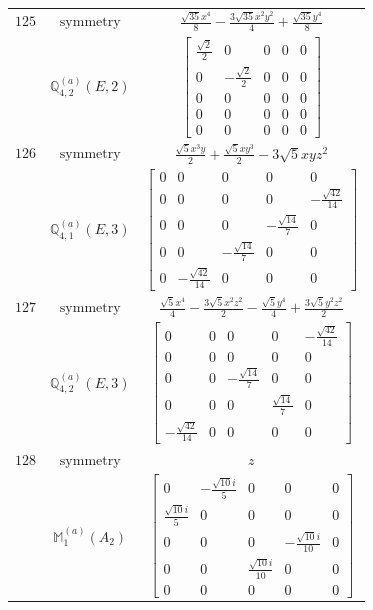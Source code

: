 \documentclass[fleqn,8pt,landscape]{jsarticle}
\begin{document}
\begin{longtable}{ccc}
$ 125 $ & $ \text{symmetry} $ & $ \frac{\sqrt{35} x^{4}}{8} - \frac{3 \sqrt{35} x^{2} y^{2}}{4} + \frac{\sqrt{35} y^{4}}{8} $ \\
$  $ & $ \mathbb{Q}_{4,2}^{(a)}(E,2) $ & $ \begin{bmatrix} \frac{\sqrt{2}}{2} & 0 & 0 & 0 & 0 \\ 0 & - \frac{\sqrt{2}}{2} & 0 & 0 & 0 \\ 0 & 0 & 0 & 0 & 0 \\ 0 & 0 & 0 & 0 & 0 \\ 0 & 0 & 0 & 0 & 0 \end{bmatrix} $ \\ \hline
$ 126 $ & $ \text{symmetry} $ & $ \frac{\sqrt{5} x^{3} y}{2} + \frac{\sqrt{5} x y^{3}}{2} - 3 \sqrt{5} x y z^{2} $ \\
$  $ & $ \mathbb{Q}_{4,1}^{(a)}(E,3) $ & $ \begin{bmatrix} 0 & 0 & 0 & 0 & 0 \\ 0 & 0 & 0 & 0 & - \frac{\sqrt{42}}{14} \\ 0 & 0 & 0 & - \frac{\sqrt{14}}{7} & 0 \\ 0 & 0 & - \frac{\sqrt{14}}{7} & 0 & 0 \\ 0 & - \frac{\sqrt{42}}{14} & 0 & 0 & 0 \end{bmatrix} $ \\ \hline
$ 127 $ & $ \text{symmetry} $ & $ \frac{\sqrt{5} x^{4}}{4} - \frac{3 \sqrt{5} x^{2} z^{2}}{2} - \frac{\sqrt{5} y^{4}}{4} + \frac{3 \sqrt{5} y^{2} z^{2}}{2} $ \\
$  $ & $ \mathbb{Q}_{4,2}^{(a)}(E,3) $ & $ \begin{bmatrix} 0 & 0 & 0 & 0 & - \frac{\sqrt{42}}{14} \\ 0 & 0 & 0 & 0 & 0 \\ 0 & 0 & - \frac{\sqrt{14}}{7} & 0 & 0 \\ 0 & 0 & 0 & \frac{\sqrt{14}}{7} & 0 \\ - \frac{\sqrt{42}}{14} & 0 & 0 & 0 & 0 \end{bmatrix} $ \\ \hline
$ 128 $ & $ \text{symmetry} $ & $ z $ \\
$  $ & $ \mathbb{M}_{1}^{(a)}(A_{2}) $ & $ \begin{bmatrix} 0 & - \frac{\sqrt{10} i}{5} & 0 & 0 & 0 \\ \frac{\sqrt{10} i}{5} & 0 & 0 & 0 & 0 \\ 0 & 0 & 0 & - \frac{\sqrt{10} i}{10} & 0 \\ 0 & 0 & \frac{\sqrt{10} i}{10} & 0 & 0 \\ 0 & 0 & 0 & 0 & 0 \end{bmatrix} $ \\ \hline

\end{longtable}
\end{document}

